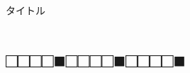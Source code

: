 \documentclass[
tate,
book,
openany,
paper={202mm,270mm},
oneside,
fontsize=9pt, %
jafontsize=9pt, %
head_space=11truemm, %
gutter=8truemm, %
line_length=78zw, %
number_of_lines=35, %
column_gap=5truemm,%
headfoot_verticalposition=4truemm,%
draft
]{jlreq}
\begin{document}
%
\pagestyle{honbun}%

\thispagestyle{empty}
\begin{minipage}{170truemm}
\null\vspace{95truemm}%
\begin{center}

{\LARGE タイトル}\hspace{2\zw}{\large 著者名}%
\end{center}
\end{minipage}
\newpage

\begin{multicols*}{3}
\tableofcontents %
\end{multicols*}

\part{□□□□■□□□□■□□□□■}
\end{document}
